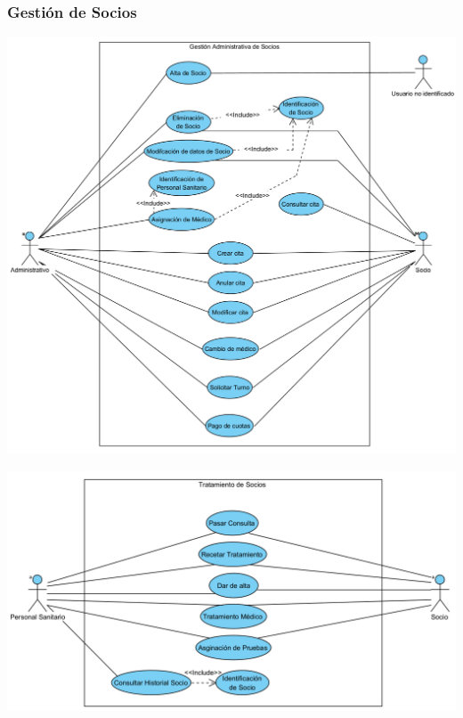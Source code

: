 \documentclass[12pt, spanish]{article}
\begin{document}
\subsubsection*{Gestión de Socios}
\begin{centering}\includegraphics[scale = 0.50]{diagramas_cu/2.png}\\[1.0 cm]\end{centering}
\begin{centering}\includegraphics[scale = 0.50]{diagramas_cu/3.png}\\[1.0 cm]\end{centering}
\end{document}
